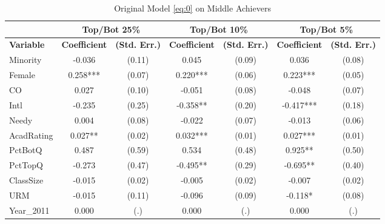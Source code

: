 \begin{sidewaystable}[!htbp]\centering
  \begin{threeparttable}
    \caption{Original Model \eqref{eq:0} on Middle Achievers}\label{table:c1}
    \begin{tabular}{l|c|c|c|c|c|c}
      \hline\hline 
                        & \multicolumn{2}{|c|}{Top/Bot 25\%} & \multicolumn{2}{|c|}{Top/Bot 10\%} & \multicolumn{2}{|c}{Top/Bot 5\%}                                                               \\
      \hline
      \textbf{Variable} & \textbf{Coefficient}         & \textbf{(Std. Err.)}         & \textbf{Coefficient} & \textbf{(Std. Err.)} & \textbf{Coefficient} & \textbf{(Std. Err.)} \\ 
      \hline
      \hline 
      Minority          & -0.036                   & (0.11)                    & 0.045     & (0.09) & 0.036     & (0.08) \\
      Female            & 0.258***                 & (0.07)                    & 0.220***  & (0.06) & 0.223***  & (0.05) \\
      CO                & 0.027                    & (0.10)                    & -0.051    & (0.08) & -0.048    & (0.07) \\
      Intl              & -0.235                   & (0.25)                    & -0.358**  & (0.20) & -0.417*** & (0.18) \\
      Needy             & 0.004                    & (0.08)                    & -0.022    & (0.07) & -0.013    & (0.06) \\
      AcadRating        & 0.027**                  & (0.02)                    & 0.032***  & (0.01) & 0.027***  & (0.01) \\
      PctBotQ           & 0.487                    & (0.59)                    & 0.534     & (0.48) & 0.925**   & (0.50) \\
      PctTopQ           & -0.273                   & (0.47)                    & -0.495**  & (0.29) & -0.695**  & (0.40) \\
      ClassSize         & -0.015                   & (0.02)                    & -0.005    & (0.02) & -0.007    & (0.02) \\
      URM               & -0.015                   & (0.11)                    & -0.096    & (0.09) & -0.118*   & (0.08) \\
      Year\_2011 & 0.000                    & (.)                       & 0.000     & (.)    & 0.000     & (.)    \\

\end{tabular}
\end{threeparttable}
\end{sidewaystable}
